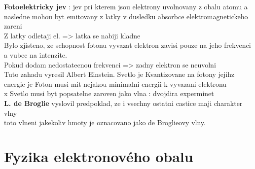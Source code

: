 \documentclass{report}
\begin{document}
\textbf{Fotoelektricky jev} : jev pri kterem jsou elektrony uvolnovany z obalu atomu a nasledne mohou byt emitovany z latky v dusledku absorbce elektromagnetickeho zareni \\
Z latky odletaji el. => latka se nabiji kladne \\
Bylo zjisteno, ze schopnost fotonu vyvazat elektron zavisi pouze na jeho frekvenci a vubec na intenzite. \\
Pokud dodam nedostatecnou frekvenci => zadny elektron se neuvolni \\
Tuto zahadu vyresil Albert Einstein. Svetlo je Kvantizovane na fotony jejihz energie je 
Foton musi mit nejakou minimalni energii k vyvazani elektronu \\
x Svetlo musi byt popsatelne zaroven jako vlna : dvojdira experminet  \\


\textbf{L. de Broglie} vyslovil predpoklad, ze i vsechny ostatni castice maji charakter vlny \\

toto vlneni jakekoliv hmoty je oznacovano jako de Broglieovy vlny.



\newpage


\section{Fyzika elektronového obalu}
\end{document}
